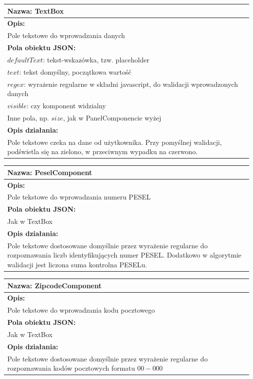\documentclass[licencjacka]{pracamgr}
\begin{document}
\begin{tabularx}{\linewidth}{|X|}\hline
\textbf{Nazwa:}
TextBox
\\\hline
\textbf{Opis:}\\

Pole tekstowe do wprowadzania danych\\
\hline
\textbf{Pola obiektu JSON:} \\
$defaultText$: tekst-wskazówka, tzw. placeholder\\
$text$: tekst domyślny, początkowa wartość\\
$regex$: wyrażenie regularne w składni javascript, do walidacji wprowadzonych danych\\
$visible$: czy komponent widzialny\\
Inne pola, np. $size$, jak w PanelComponencie wyżej
\\\hline
\textbf{Opis działania:}\\
Pole tekstowe czeka na dane od użytkownika. Przy pomyślnej walidacji, podświetla się na zielono, w przeciwnym wypadku na czerwono.
\\\hline
\end{tabularx}

\begin{tabularx}{\linewidth}{|X|}\hline
\textbf{Nazwa:}
PeselComponent
\\\hline
\textbf{Opis:}\\

Pole tekstowe do wprowadzania numeru PESEL\\
\hline
\textbf{Pola obiektu JSON:} \\
Jak w TextBox
\\\hline
\textbf{Opis działania:}\\
Pole tekstowe dostosowane domyślnie przez wyrażenie regularne do rozpoznawania liczb identyfikujących numer PESEL.
Dodatkowo w algorytmie walidacji jest liczona suma kontrolna PESELu.
\\\hline
\end{tabularx}


\begin{tabularx}{\linewidth}{|X|}\hline
\textbf{Nazwa:}
ZipcodeComponent
\\\hline
\textbf{Opis:}\\

Pole tekstowe do wprowadzania kodu pocztowego\\
\hline
\textbf{Pola obiektu JSON:} \\
Jak w TextBox
\\\hline
\textbf{Opis działania:}\\
Pole tekstowe dostosowane domyślnie przez wyrażenie regularne do rozpoznawania kodów pocztowych formatu $00-000$
\\\hline
\end{tabularx}
\end{document}
